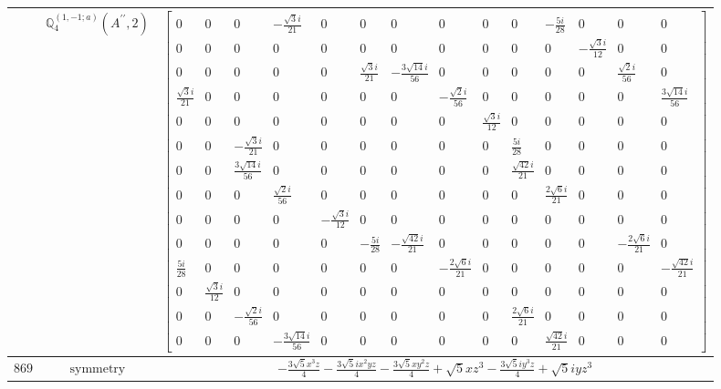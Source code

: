\documentclass[fleqn,8pt,landscape]{jsarticle}
\begin{document}
\begin{longtable}{ccc}
$  $ & $ \mathbb{Q}_{4}^{(1,-1;a)}(A^{\prime\prime},2) $ & $ \begin{bmatrix} 0 & 0 & 0 & - \frac{\sqrt{3} i}{21} & 0 & 0 & 0 & 0 & 0 & 0 & - \frac{5 i}{28} & 0 & 0 & 0 \\ 0 & 0 & 0 & 0 & 0 & 0 & 0 & 0 & 0 & 0 & 0 & - \frac{\sqrt{3} i}{12} & 0 & 0 \\ 0 & 0 & 0 & 0 & 0 & \frac{\sqrt{3} i}{21} & - \frac{3 \sqrt{14} i}{56} & 0 & 0 & 0 & 0 & 0 & \frac{\sqrt{2} i}{56} & 0 \\ \frac{\sqrt{3} i}{21} & 0 & 0 & 0 & 0 & 0 & 0 & - \frac{\sqrt{2} i}{56} & 0 & 0 & 0 & 0 & 0 & \frac{3 \sqrt{14} i}{56} \\ 0 & 0 & 0 & 0 & 0 & 0 & 0 & 0 & \frac{\sqrt{3} i}{12} & 0 & 0 & 0 & 0 & 0 \\ 0 & 0 & - \frac{\sqrt{3} i}{21} & 0 & 0 & 0 & 0 & 0 & 0 & \frac{5 i}{28} & 0 & 0 & 0 & 0 \\ 0 & 0 & \frac{3 \sqrt{14} i}{56} & 0 & 0 & 0 & 0 & 0 & 0 & \frac{\sqrt{42} i}{21} & 0 & 0 & 0 & 0 \\ 0 & 0 & 0 & \frac{\sqrt{2} i}{56} & 0 & 0 & 0 & 0 & 0 & 0 & \frac{2 \sqrt{6} i}{21} & 0 & 0 & 0 \\ 0 & 0 & 0 & 0 & - \frac{\sqrt{3} i}{12} & 0 & 0 & 0 & 0 & 0 & 0 & 0 & 0 & 0 \\ 0 & 0 & 0 & 0 & 0 & - \frac{5 i}{28} & - \frac{\sqrt{42} i}{21} & 0 & 0 & 0 & 0 & 0 & - \frac{2 \sqrt{6} i}{21} & 0 \\ \frac{5 i}{28} & 0 & 0 & 0 & 0 & 0 & 0 & - \frac{2 \sqrt{6} i}{21} & 0 & 0 & 0 & 0 & 0 & - \frac{\sqrt{42} i}{21} \\ 0 & \frac{\sqrt{3} i}{12} & 0 & 0 & 0 & 0 & 0 & 0 & 0 & 0 & 0 & 0 & 0 & 0 \\ 0 & 0 & - \frac{\sqrt{2} i}{56} & 0 & 0 & 0 & 0 & 0 & 0 & \frac{2 \sqrt{6} i}{21} & 0 & 0 & 0 & 0 \\ 0 & 0 & 0 & - \frac{3 \sqrt{14} i}{56} & 0 & 0 & 0 & 0 & 0 & 0 & \frac{\sqrt{42} i}{21} & 0 & 0 & 0 \end{bmatrix} $ \\ \hline
$ 869 $ & $ \text{symmetry} $ & $ - \frac{3 \sqrt{5} x^{3} z}{4} - \frac{3 \sqrt{5} i x^{2} y z}{4} - \frac{3 \sqrt{5} x y^{2} z}{4} + \sqrt{5} x z^{3} - \frac{3 \sqrt{5} i y^{3} z}{4} + \sqrt{5} i y z^{3} $ \\

\end{longtable}
\end{document}

